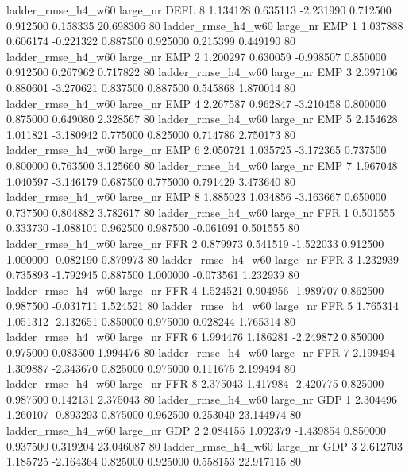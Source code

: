 ladder_rmse_h4_w60   large_nr     DEFL                 8  1.134128  0.635113  -2.231990 0.712500 0.912500  0.158335   20.698306 80
 ladder_rmse_h4_w60   large_nr      EMP                 1  1.037888  0.606174  -0.221322 0.887500 0.925000  0.215399    0.449190 80
 ladder_rmse_h4_w60   large_nr      EMP                 2  1.200297  0.630059  -0.998507 0.850000 0.912500  0.267962    0.717822 80
 ladder_rmse_h4_w60   large_nr      EMP                 3  2.397106  0.880601  -3.270621 0.837500 0.887500  0.545868    1.870014 80
 ladder_rmse_h4_w60   large_nr      EMP                 4  2.267587  0.962847  -3.210458 0.800000 0.875000  0.649080    2.328567 80
 ladder_rmse_h4_w60   large_nr      EMP                 5  2.154628  1.011821  -3.180942 0.775000 0.825000  0.714786    2.750173 80
 ladder_rmse_h4_w60   large_nr      EMP                 6  2.050721  1.035725  -3.172365 0.737500 0.800000  0.763500    3.125660 80
 ladder_rmse_h4_w60   large_nr      EMP                 7  1.967048  1.040597  -3.146179 0.687500 0.775000  0.791429    3.473640 80
 ladder_rmse_h4_w60   large_nr      EMP                 8  1.885023  1.034856  -3.163667 0.650000 0.737500  0.804882    3.782617 80
 ladder_rmse_h4_w60   large_nr      FFR                 1  0.501555  0.333730  -1.088101 0.962500 0.987500 -0.061091    0.501555 80
 ladder_rmse_h4_w60   large_nr      FFR                 2  0.879973  0.541519  -1.522033 0.912500 1.000000 -0.082190    0.879973 80
 ladder_rmse_h4_w60   large_nr      FFR                 3  1.232939  0.735893  -1.792945 0.887500 1.000000 -0.073561    1.232939 80
 ladder_rmse_h4_w60   large_nr      FFR                 4  1.524521  0.904956  -1.989707 0.862500 0.987500 -0.031711    1.524521 80
 ladder_rmse_h4_w60   large_nr      FFR                 5  1.765314  1.051312  -2.132651 0.850000 0.975000  0.028244    1.765314 80
 ladder_rmse_h4_w60   large_nr      FFR                 6  1.994476  1.186281  -2.249872 0.850000 0.975000  0.083500    1.994476 80
 ladder_rmse_h4_w60   large_nr      FFR                 7  2.199494  1.309887  -2.343670 0.825000 0.975000  0.111675    2.199494 80
 ladder_rmse_h4_w60   large_nr      FFR                 8  2.375043  1.417984  -2.420775 0.825000 0.987500  0.142131    2.375043 80
 ladder_rmse_h4_w60   large_nr      GDP                 1  2.304496  1.260107  -0.893293 0.875000 0.962500  0.253040   23.144974 80
 ladder_rmse_h4_w60   large_nr      GDP                 2  2.084155  1.092379  -1.439854 0.850000 0.937500  0.319204   23.046087 80
 ladder_rmse_h4_w60   large_nr      GDP                 3  2.612703  1.185725  -2.164364 0.825000 0.925000  0.558153   22.917115 80
